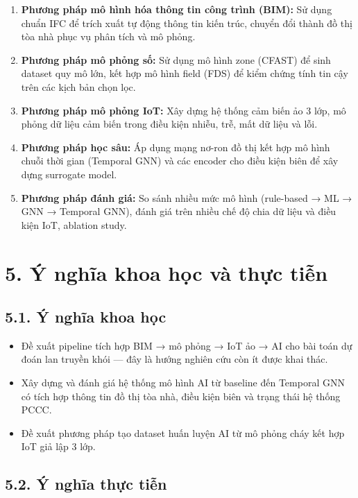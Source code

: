 \begin{enumerate}
  \item \textbf{Phương pháp mô hình hóa thông tin công trình (BIM):} Sử dụng chuẩn IFC để trích xuất tự động thông tin kiến trúc, chuyển đổi thành đồ thị tòa nhà phục vụ phân tích và mô phỏng.
  \item \textbf{Phương pháp mô phỏng số:} Sử dụng mô hình zone (CFAST) để sinh dataset quy mô lớn, kết hợp mô hình field (FDS) để kiểm chứng tính tin cậy trên các kịch bản chọn lọc.
  \item \textbf{Phương pháp mô phỏng IoT:} Xây dựng hệ thống cảm biến ảo 3 lớp, mô phỏng dữ liệu cảm biến trong điều kiện nhiễu, trễ, mất dữ liệu và lỗi.
  \item \textbf{Phương pháp học sâu:} Áp dụng mạng nơ-ron đồ thị kết hợp mô hình chuỗi thời gian (Temporal GNN) và các encoder cho điều kiện biên để xây dựng surrogate model.
  \item \textbf{Phương pháp đánh giá:} So sánh nhiều mức mô hình (rule-based → ML → GNN → Temporal GNN), đánh giá trên nhiều chế độ chia dữ liệu và điều kiện IoT, ablation study.
\end{enumerate}

\section*{5. Ý nghĩa khoa học và thực tiễn}

\subsection*{5.1. Ý nghĩa khoa học}

\begin{itemize}
  \item Đề xuất pipeline tích hợp BIM → mô phỏng → IoT ảo → AI cho bài toán dự đoán lan truyền khói — đây là hướng nghiên cứu còn ít được khai thác.
  \item Xây dựng và đánh giá hệ thống mô hình AI từ baseline đến Temporal GNN có tích hợp thông tin đồ thị tòa nhà, điều kiện biên và trạng thái hệ thống PCCC.
  \item Đề xuất phương pháp tạo dataset huấn luyện AI từ mô phỏng cháy kết hợp IoT giả lập 3 lớp.
\end{itemize}

\subsection*{5.2. Ý nghĩa thực tiễn}

